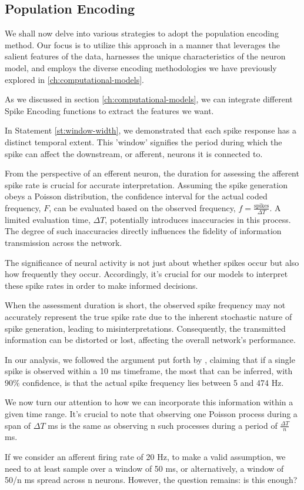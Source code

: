 \subsection{Population Encoding}

We shall now delve into various strategies to adopt the population encoding method. Our focus is to utilize this approach in a manner that leverages the salient features of the data, harnesses the unique characteristics of the neuron model, and employs the diverse encoding methodologies we have previously explored in \ref{ch:computational-models}.

As we discussed in section \ref{ch:computational-models}, we can integrate different Spike Encoding functions to extract the features we want.

In Statement \ref{st:window-width}, we demonstrated that each spike response has a distinct temporal extent. This 'window' signifies the period during which the spike can affect the downstream, or afferent, neurons it is connected to.

From the perspective of an efferent neuron, the duration for assessing the afferent spike rate is crucial for accurate interpretation. Assuming the spike generation obeys a Poisson distribution, the confidence interval for the actual coded frequency, $F$, can be evaluated based on the observed frequency, $f = \frac{\text{spikes}}{\Delta T}$. A limited evaluation time, $\Delta T$, potentially introduces inaccuracies in this process. The degree of such inaccuracies directly influences the fidelity of information transmission across the network.

The significance of neural activity is not just about whether spikes occur but also how frequently they occur. Accordingly, it's crucial for our models to interpret these spike rates in order to make informed decisions.

When the assessment duration is short, the observed spike frequency may not accurately represent the true spike rate due to the inherent stochastic nature of spike generation, leading to misinterpretations. Consequently, the transmitted information can be distorted or lost, affecting the overall network's performance.

In our analysis, we followed the argument put forth by \cite{gautrais1998rate}, claiming that if a single spike is observed within a 10 ms timeframe, the most that can be inferred, with 90\% confidence, is that the actual spike frequency lies between 5 and 474 Hz.

We now turn our attention to how we can incorporate this information within a given time range. It's crucial to note that observing one Poisson process during a span of $\Delta T$ ms is the same as observing n such processes during a period of $\frac{\Delta T}{n}$ ms.

If we consider an afferent firing rate of 20 Hz, to make a valid assumption, we need to at least sample over a window of 50 ms, or alternatively, a window of 50/n ms spread across n neurons. However, the question remains: is this enough?


